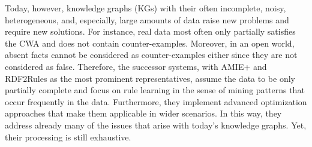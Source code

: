 Today, however, knowledge graphs (KGs) with their often incomplete, noisy, heterogeneous, and, especially, large amounts of data raise %
new problems and require new solutions.
For instance, real data most often only partially satisfies the CWA %
and does not contain counter-examples. Moreover, in an open world, absent facts cannot be considered as counter-examples either since they are not considered as false.
Therefore, the successor systems, with AMIE+ \cite{Galarraga+-VLDBJ15:amiep} and RDF2Rules \cite{WangLi-CoRR15:rdf2rules} as the most prominent representatives, 
assume the data to be only partially complete and
focus on rule learning in the sense of mining patterns that occur frequently in the data.
Furthermore, they implement advanced optimization approaches that make them applicable in wider scenarios. %
% 
In this way, they address already many of the issues that arise with today's knowledge graphs. Yet, their processing is still exhaustive.


